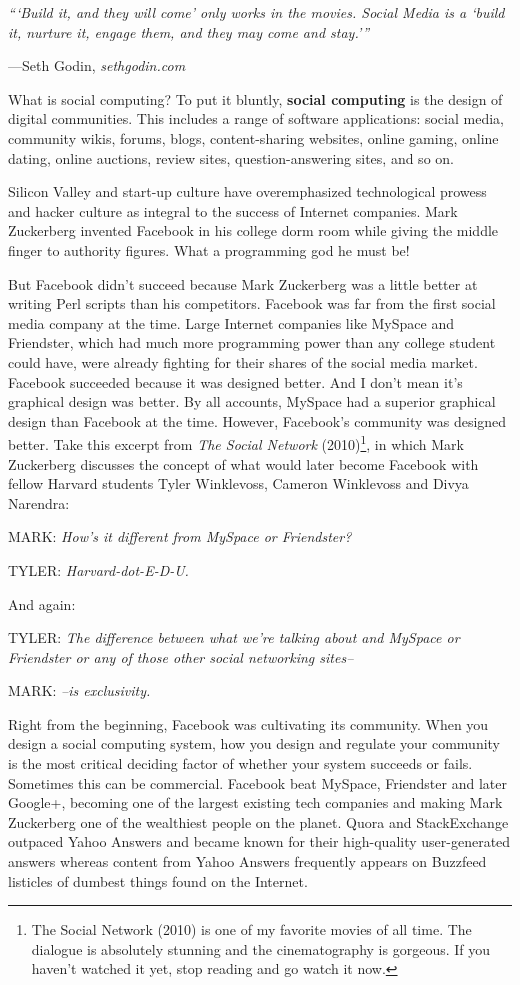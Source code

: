 \documentclass[class=book, crop=false]{standalone}
\providecommand{\keyterm}[1]{\textbf{#1}\marginnote{\scriptsize \textbf{#1}}}
\begin{document}
\epigraph{\itshape “‘Build it, and they will come’ only works in the movies. Social Media is a ‘build it, nurture it, engage them, and they may come and stay.’”}{---Seth Godin, \textit{sethgodin.com}}

What is social computing? To put it bluntly, \keyterm{social computing} is the design of digital communities. This includes a range of software applications: social media, community wikis, forums, blogs, content-sharing websites, online gaming, online dating, online auctions, review sites, question-answering sites, and so on. 

Silicon Valley and start-up culture have overemphasized technological prowess and hacker culture as integral to the success of Internet companies. Mark Zuckerberg invented Facebook in his college dorm room while giving the middle finger to authority figures. What a programming god he must be!

But Facebook didn’t succeed because Mark Zuckerberg was a little better at writing Perl scripts than his competitors. Facebook was far from the first social media company at the time. Large Internet companies like MySpace and Friendster, which had much more programming power than any college student could have, were already fighting for their shares of the social media market. Facebook succeeded because it was designed better. And I don’t mean it’s graphical design was better. By all accounts, MySpace had a superior graphical design than Facebook at the time. However, Facebook’s community was designed better. Take this excerpt from \textit{The Social Network} (2010)\footnote{The Social Network (2010) is one of my favorite movies of all time. The dialogue is absolutely stunning and the cinematography is gorgeous. If you haven’t watched it yet, stop reading and go watch it now.}, in which Mark Zuckerberg discusses the concept of what would later become Facebook with fellow Harvard students Tyler Winklevoss, Cameron Winklevoss and Divya Narendra:

MARK: \textit{How’s it different from MySpace or Friendster?}

TYLER: \textit{Harvard-dot-E-D-U.}

And again:

TYLER: \textit{The difference between what we’re talking about and MySpace or Friendster or any of those other social networking sites--}

MARK: \textit{--is exclusivity.}

Right from the beginning, Facebook was cultivating its community. When you design a social computing system, how you design and regulate your community is the most critical deciding factor of whether your system succeeds or fails. Sometimes this can be commercial. Facebook beat MySpace, Friendster and later Google+, becoming one of the largest existing tech companies and making Mark Zuckerberg one of the wealthiest people on the planet. Quora and StackExchange outpaced Yahoo Answers and became known for their high-quality user-generated answers whereas content from Yahoo Answers frequently appears on Buzzfeed listicles of dumbest things found on the Internet.
\end{document}
